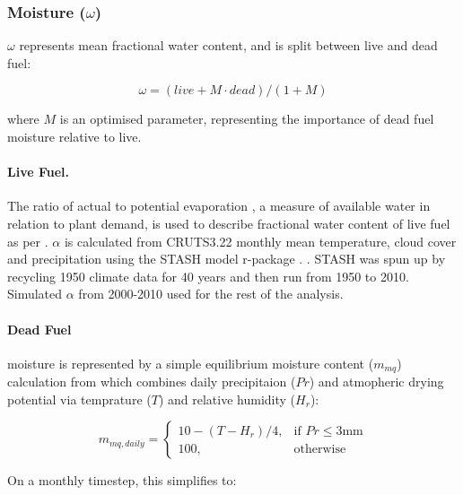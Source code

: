 \subsubsection{Moisture ($\omega$)}

$\omega$ represents mean fractional water content, and is split between live and dead fuel:

\begin{equation}
    \omega = (live + M \cdot dead) / (1 + M)
\end{equation}

where $M$ is an optimised parameter, representing the importance of dead fuel moisture relative to live.

\paragraph{Live Fuel.}
The ratio of actual to potential evaporation \citep[$\alpha$][]{prentice1993simulation}, a measure of available water in relation to plant demand, is used to describe fractional water content of live fuel as per \citet{harrison2010fire, bistinas2014causal}.
$\alpha$ is calculated from CRUTS3.22 monthly mean temperature, cloud cover and precipitation using the STASH model \citep{sykes1996bioclimatic} r-package \citep{rstash}. . STASH was spun up by recycling 1950 climate data for 40 years and then run from 1950 to 2010. Simulated $\alpha$ from 2000-2010 used for the rest of the analysis.

\paragraph{Dead Fuel} moisture is represented by a simple equilibrium moisture content ($m_{mq}$) calculation from \citep{viney1991review} which combines daily precipitaion ($Pr$) and atmopheric drying potential via temprature ($T$) and relative humidity ($H_r$):

\begin{equation}
     m_{mq, daily}=
        \begin{cases}
            10 - (T - H_r) / 4 ,& \text{if } Pr\leq 3 \text{mm}\\
            100,              & \text{otherwise}
        \end{cases}
\end{equation}

On a monthly timestep, this simplifies to:

